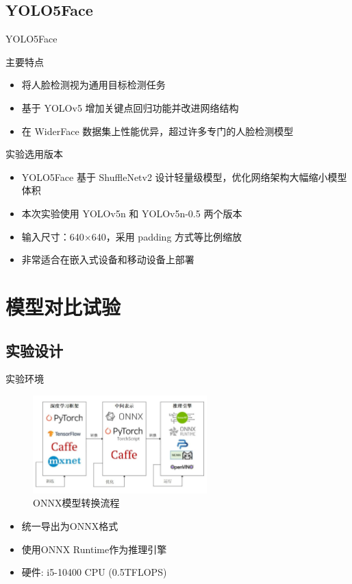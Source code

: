 \documentclass{beamer}
\begin{document}
\subsection{YOLO5Face}
\begin{frame}{YOLO5Face}
    \begin{block}{主要特点}
        \begin{itemize}
            \item 将人脸检测视为通用目标检测任务
            \item 基于 YOLOv5 增加关键点回归功能并改进网络结构
            \item 在 WiderFace 数据集上性能优异，超过许多专门的人脸检测模型
        \end{itemize}
    \end{block}
    
    \begin{block}{实验选用版本}
        \begin{itemize}
            \item YOLO5Face 基于 ShuffleNetv2 设计轻量级模型，优化网络架构大幅缩小模型体积
            \item 本次实验使用 YOLOv5n 和 YOLOv5n-0.5 两个版本
            \item 输入尺寸：640$\times$640，采用 padding 方式等比例缩放
            \item 非常适合在嵌入式设备和移动设备上部署
        \end{itemize}
    \end{block}
\end{frame}

\section{模型对比试验}

\subsection{实验设计}
\begin{frame}{实验环境}

    \begin{figure}[h]
        \centering
        \includegraphics[width=0.6\textwidth]{pic/pipeline.jpg}
        \caption{ONNX模型转换流程}
    \end{figure}

    \begin{itemize}
        \item 统一导出为ONNX格式
        \item 使用ONNX Runtime作为推理引擎
        \item 硬件: i5-10400 CPU (0.5TFLOPS)
    \end{itemize}
\end{frame}
\end{document}

